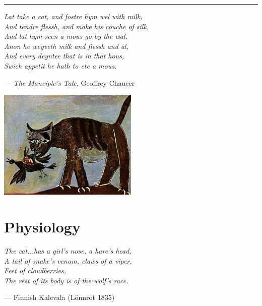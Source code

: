 \documentclass{article}
\begin{document}
\begin{center}\rule{0.5\textwidth}{0.1mm}\end{center}

\begin{multicols}{2}
    \begin{minipage}{0.5\textwidth}
        \begin{flushleft}
            \emph{Lat take a cat, and fostre hym wel with milk,\\
        And tendre flessh, and make his couche of silk,\\
        And lat hym seen a mous go by the wal,\\
        Anon he weyveth milk and flessh and al,\\
        And every deyntee that is in that hous,\\
        Swich appetit he hath to ete a mous.
        }
        \end{flushleft}
        \begin{flushright}--- \emph{The Manciple's Tale}, Geoffrey Chaucer\end{flushright}
    \end{minipage}
    \begin{minipage}{0.5\textwidth}
        \centering
        \includegraphics[width=0.5\textwidth]{img/picasso-cat.png}
    \end{minipage}
\end{multicols}


\dotfill

\section*{Physiology}
\begin{flushright}
\begin{minipage}{8cm}
    \begin{flushleft}
        \emph{The cat...has a girl's nose, a hare's head,\\
            A tail of snake's venom, claws of a viper,\\
            Feet of cloudberries,\\
            The rest of its body is of the wolf's race.}
    \end{flushleft}
    \begin{flushright}--- Finnish Kalevala (L\"onnrot 1835)\end{flushright}
\end{minipage}
\end{flushright}
\end{document}
